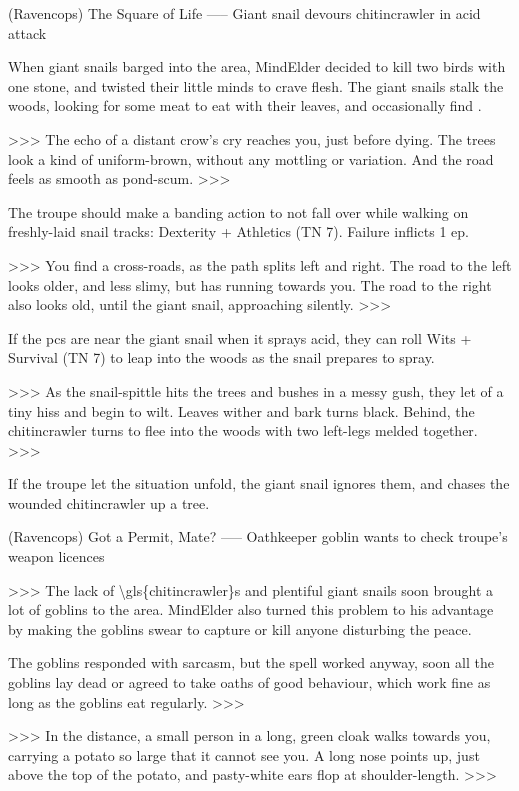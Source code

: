 (Ravencops) The Square of Life
-----
{Giant snail devours \gls{chitincrawler} in acid attack}

When giant snails barged into the area, MindElder decided to kill two birds with one stone, and twisted their little minds to crave flesh.
The giant snails stalk the woods, looking for some meat to eat with their leaves, and occasionally find .

>>>
The echo of a distant crow's cry reaches you, just before dying.
The trees look a kind of uniform-brown, without any mottling or variation.
And the road feels as smooth as pond-scum.
>>>

The troupe should make a banding action to not fall over while walking on freshly-laid snail tracks: Dexterity + Athletics (TN 7).
Failure inflicts 1 \gls{ep}.

>>>
You find a cross-roads, as the path splits left and right.
The road to the left looks older, and less slimy, but has  running towards you.
The road to the right also looks old, until the giant snail, approaching silently.
>>>

If the \glspl{pc}  are near the giant snail when it sprays acid, they can roll Wits + Survival (TN 7) to leap into the woods as the snail prepares to spray.

>>>
As the snail-spittle hits the trees and bushes in a messy gush, they let of a tiny hiss and begin to wilt.
Leaves wither and bark turns black.
Behind, the \gls{chitincrawler} turns to flee into the woods with two left-legs melded together.
>>>

If the troupe let the situation unfold, the giant snail ignores them, and chases the wounded \gls{chitincrawler} up a tree.

(Ravencops) Got a Permit, Mate?
-----
{Oathkeeper goblin wants to check troupe's weapon licences}

>>>
The lack of \glspl{\gls{chitincrawler}} and plentiful giant snails soon brought a lot of goblins to the area.
MindElder also turned this problem to his advantage by making the goblins swear to capture or kill anyone disturbing the peace.

The goblins responded with sarcasm, but the spell worked anyway, soon all the goblins lay dead or agreed to take oaths of good behaviour, which work fine as long as the goblins eat regularly.
>>>

>>>
In the distance, a small person in a long, green cloak walks towards you, carrying a potato so large that it cannot see you.
A long nose points up, just above the top of the potato, and pasty-white ears flop at shoulder-length.
>>>

